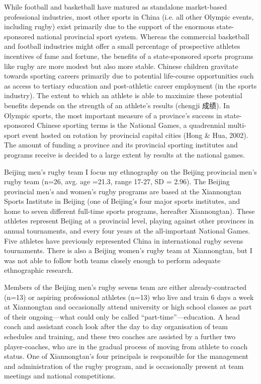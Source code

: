 \documentclass[12pt]{report}
\begin{document}
While football and basketball have matured as standalone market-based professional industries, most other sports in China (i.e. all other Olympic events, including rugby) exist primarily due to the support of the enormous state-sponsored national provincial sport system.  Whereas the commercial basketball and football industries might offer a small percentage of prospective athletes incentives of fame and fortune, the benefits of a state-sponsored sports programs like rugby are more modest but also more stable.  Chinese children gravitate towards sporting careers primarily due to potential life-course opportunities such as access to tertiary education and post-athletic career employment (in the sports industry).  The extent to which an athlete is able to maximize these potential benefits depends on the strength of an athlete’s results (chengji 成绩).  In Olympic sports, the most important measure of a province’s success in state-sponsored Chinese sporting terms is the National Games, a quadrennial multi-sport event hosted on rotation by provincial capital cities (Hong & Hua, 2002).  The amount of funding a province and its provincial sporting institutes and programs receive is decided to a large extent by results at the national games.

Beijing men’s rugby team
I focus my ethnography on the Beijing provincial men’s rugby team (n=26, avg. age =21.3, range 17-27, SD = 2.96).  The Beijing provincial men’s and women’s rugby programs are based at the Xiannongtan Sports Institute in Beijing (one of Beijing’s four major sports institutes, and home to seven different full-time sports programs, hereafter Xiannongtan).  These athletes represent Beijing at a provincial level, playing against other provinces in annual tournaments, and every four years at the all-important National Games.  Five athletes have previously represented China in international rugby sevens tournaments.  There is also a Beijing women’s rugby team at Xiannongtan, but I was not able to follow both teams closely enough to perform adequate ethnographic research.

Members of the Beijing men’s rugby sevens team are either already-contracted (n=13) or aspiring professional athletes (n=13) who live and train 6 days a week at Xiannongtan and occasionally attend university or high school classes as part of their ongoing—what could only be called “part-time”—education.  A head coach and assistant coach look after the day to day organisation of team schedules and training, and these two coaches are assisted by a further two player-coaches, who are in the gradual process of moving from athlete to coach status.  One of Xiannongtan’s four principals is responsible for the management and administration of the rugby program, and is occasionally present at team meetings and national competitions.
\end{document}
